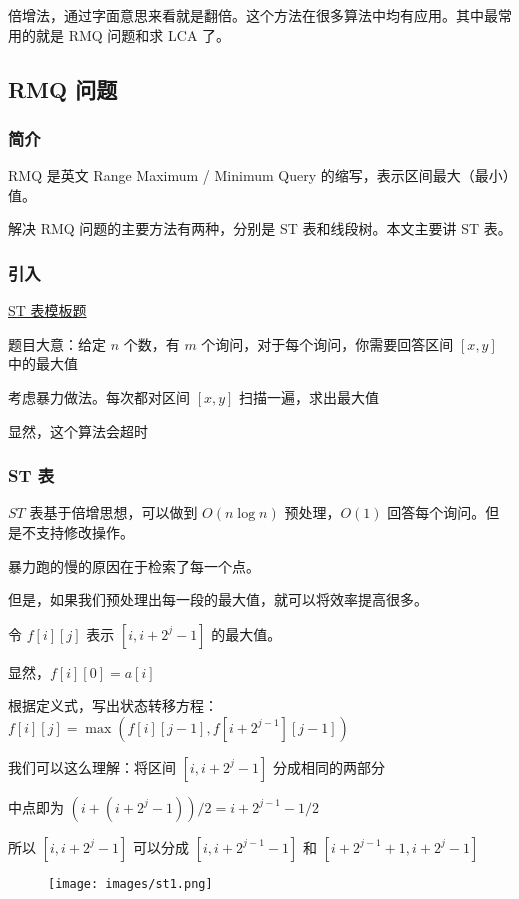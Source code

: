 
倍增法，通过字面意思来看就是翻倍。这个方法在很多算法中均有应用。其中最常用的就是 RMQ 问题和求 LCA 了。

\subsection{RMQ 问题}

\subsubsection{简介}

RMQ 是英文 Range Maximum / Minimum Query 的缩写，表示区间最大（最小）值。

解决 RMQ 问题的主要方法有两种，分别是 ST 表和线段树。本文主要讲 ST 表。

\subsubsection{引入}

\href{https://www.luogu.org/problemnew/show/P3865}{ST 表模板题}

题目大意：给定 $n$ 个数，有 $m$ 个询问，对于每个询问，你需要回答区间 $[x,y]$ 中的最大值

考虑暴力做法。每次都对区间 $[x,y]$ 扫描一遍，求出最大值

显然，这个算法会超时

\subsubsection{ST 表}

$ST$ 表基于倍增思想，可以做到 $O(n\log n)$ 预处理，$O(1)$ 回答每个询问。但是不支持修改操作。

暴力跑的慢的原因在于检索了每一个点。

但是，如果我们预处理出每一段的最大值，就可以将效率提高很多。

令 $f[i][j]$ 表示 $[i,i+2^j-1]$ 的最大值。

显然，$f[i][0]=a[i]$

根据定义式，写出状态转移方程：$f[i][j]=\max(f[i][j-1],f[i+2^{j-1}][j-1])$

我们可以这么理解：将区间 $[i,i+2^j-1]$ 分成相同的两部分

中点即为 $(i+(i+2^j-1))/2=i+2^{j-1}-1/2$

所以 $[i,i+2^j-1]$ 可以分成 $[i,i+2^{j-1}-1]$ 和 $[i+2^{j-1}+1,i+2^j-1]$

\begin{figure}[h]
\centering
\texttt{[image: images/st1.png]} 

\end{figure}

